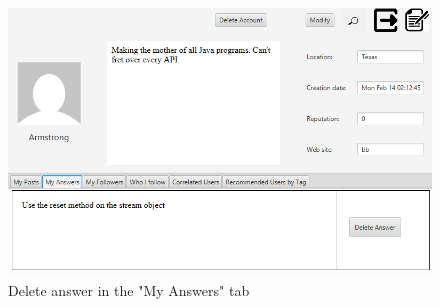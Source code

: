 \documentclass[11pt]{report}
\begin{document}
\begin{figure}[H]
  \centering
  \includegraphics[width=\textwidth,keepaspectratio=true]{img/user_manual/RimuovereRisposta2.png}
  \caption{Delete answer in the "My Answers" tab}
  \label{fig:RimuovereRisposta2}
\end{figure}
\end{document}
